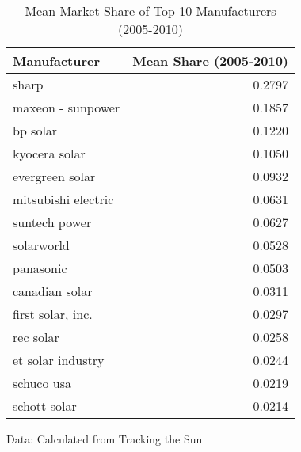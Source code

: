 \begin{table}[!t]
\caption*{
{\large Mean Market Share of Top 10 Manufacturers (2005-2010)}
} 
\fontsize{12.0pt}{14.4pt}\selectfont
\begin{tabular*}{\linewidth}{@{\extracolsep{\fill}}lr}
\toprule
Manufacturer & Mean Share (2005-2010) \\ 
\midrule\addlinespace[2.5pt]
sharp & 0.2797 \\ 
maxeon - sunpower & 0.1857 \\ 
bp solar & 0.1220 \\ 
kyocera solar & 0.1050 \\ 
evergreen solar & 0.0932 \\ 
mitsubishi electric & 0.0631 \\ 
suntech power & 0.0627 \\ 
solarworld & 0.0528 \\ 
panasonic & 0.0503 \\ 
canadian solar & 0.0311 \\ 
first solar, inc. & 0.0297 \\ 
rec solar & 0.0258 \\ 
et solar industry & 0.0244 \\ 
schuco usa & 0.0219 \\ 
schott solar & 0.0214 \\ 
\bottomrule
\end{tabular*}
\begin{minipage}{\linewidth}
Data: Calculated from Tracking the Sun\\
\end{minipage}
\end{table}
